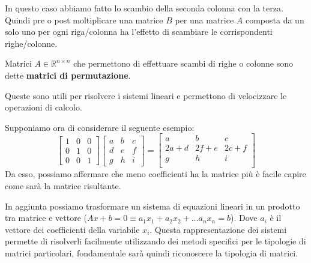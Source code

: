 In questo caso abbiamo fatto lo scambio della seconda colonna con la terza.
Quindi pre o post moltiplicare una matrice $B$ per una matrice $A$ composta da
un solo uno per ogni riga/colonna ha l'effetto di scambiare le corrispondenti
righe/colonne.
\begin{definizione}
    Matrici $A \in \mathbb{R}^{n\times n}$ che permettono di effettuare scambi di
    righe o colonne sono dette \textbf{matrici di permutazione}.
\end{definizione}
Queste sono utili per risolvere i sistemi lineari e permettono di velocizzare le
operazioni di calcolo.

Supponiamo ora di considerare il seguente esempio:
\begin{equation*}
    \left[\begin{array}{ccc}
            1 & 0 & 0 \\
            0 & 1 & 0 \\
            0 & 0 & 1
        \end{array}\right]  \left[\begin{array}{ccc}
            a & b & c \\
            d & e & f \\
            g & h & i
        \end{array}\right] = \left[\begin{array}{ccc}
            a    & b    & c    \\
            2a+d & 2f+e & 2c+f \\
            g    & h    & i    \\
        \end{array}\right]
\end{equation*}
Da esso, possiamo affermare che meno coefficienti ha la matrice più è facile
capire come sarà la matrice risultante.

In aggiunta possiamo trasformare un sistema di equazioni lineari in un prodotto
tra matrice e vettore ($Ax+b=0\equiv a_1x_1+a_2x_2+\dots a_n x_n = b$). Dove $a_i$
è il vettore dei coefficienti della variabile $x_i$. Questa rappresentazione dei
sistemi permette di risolverli facilmente utilizzando dei metodi specifici per le
tipologie di matrici particolari, fondamentale sarà quindi riconoscere la tipologia
di matrici.


